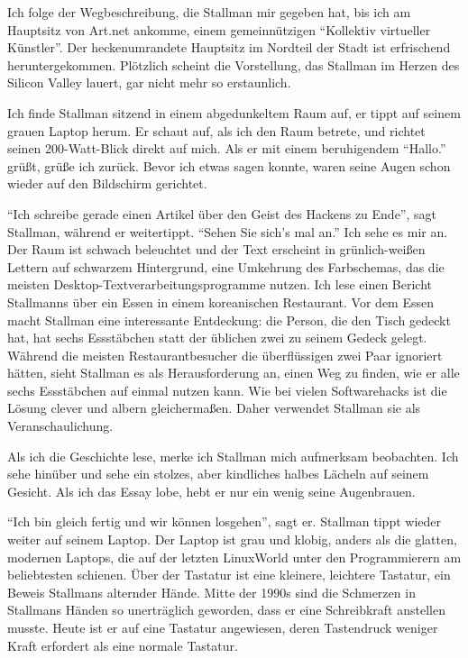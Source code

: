 Ich folge der Wegbeschreibung, die Stallman mir gegeben hat, bis ich am Hauptsitz von Art.net ankomme, einem gemeinnützigen "`Kollektiv virtueller Künstler"'. Der heckenumrandete Hauptsitz im Nordteil der Stadt ist erfrischend heruntergekommen. Plötzlich scheint die Vorstellung, das Stallman im Herzen des Silicon Valley lauert, gar nicht mehr so erstaunlich.

Ich finde Stallman sitzend in einem abgedunkeltem Raum auf, er tippt auf seinem grauen Laptop herum. Er schaut auf, als ich den Raum betrete, und richtet seinen 200-Watt-Blick direkt auf mich. Als er mit einem beruhigendem "`Hallo."' grüßt, grüße ich zurück. Bevor ich etwas sagen konnte, waren seine Augen schon wieder auf den Bildschirm gerichtet.

"`Ich schreibe gerade einen Artikel über den Geist des Hackens zu Ende"', sagt Stallman, während er weitertippt. "`Sehen Sie sich's mal an."'
Ich sehe es mir an. Der Raum ist schwach beleuchtet und der Text erscheint in grünlich-weißen Lettern auf schwarzem Hintergrund, eine Umkehrung des Farbschemas, das die meisten Desktop-Textverarbeitungsprogramme nutzen. Ich lese einen Bericht Stallmanns über ein Essen in einem koreanischen Restaurant. Vor dem Essen macht Stallman eine interessante Entdeckung: die Person, die den Tisch gedeckt hat, hat sechs Essstäbchen statt der üblichen zwei zu seinem Gedeck gelegt. Während die meisten Restaurantbesucher die überflüssigen zwei Paar ignoriert hätten, sieht Stallman es als Herausforderung an, einen Weg zu finden, wie er alle sechs Essstäbchen auf einmal nutzen kann. Wie bei vielen Softwarehacks ist die Lösung clever und albern gleichermaßen. Daher verwendet Stallman sie als  Veranschaulichung.

Als ich die Geschichte lese, merke ich Stallman mich aufmerksam beobachten. Ich sehe hinüber und sehe ein stolzes, aber kindliches halbes Lächeln auf seinem Gesicht. Als ich das Essay lobe, hebt er nur ein wenig seine Augenbrauen.

"`Ich bin gleich fertig und wir können losgehen"', sagt er.
Stallman tippt wieder weiter auf seinem Laptop. Der Laptop ist grau und klobig, anders als die glatten, modernen Laptops, die auf der letzten LinuxWorld unter den Programmierern am beliebtesten schienen. Über der Tastatur ist eine kleinere, leichtere Tastatur, ein Beweis Stallmans alternder Hände. Mitte der 1990s sind die Schmerzen in Stallmans Händen so unerträglich geworden, dass er eine Schreibkraft anstellen musste. Heute ist er auf eine Tastatur angewiesen, deren Tastendruck weniger Kraft erfordert als eine normale Tastatur.


